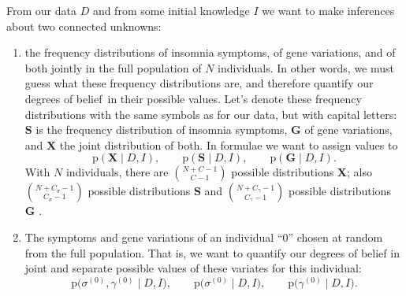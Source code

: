 \documentclass[\ifafour a4paper,12pt,\else a5paper,10pt,\fi%
onecolumn,oneside,article,%
british%
]{memoir}
\theoremstyle{remark}
\theoremstyle{innote}
\newcommand*{\citep}{\parencites}
\newcommand*{\pf}{\mathrm{p}}%
\renewcommand*{\|}{\mathpunct{|}}
\newcommand*{\sect}{\S}%
\newcommand*{\dobs}{degrees of belief}
\newcommand*{\yD}{D}
\newcommand*{\yI}{I}
\newcommand*{\ys}{\sigma}
\newcommand*{\yg}{\gamma}
\newcommand*{\ysi}[1]{\ys^{(#1)}}
\newcommand*{\ygi}[1]{\yg^{(#1)}}
\newcommand*{\yso}{\ysi{0}}
\newcommand*{\ygo}{\ygi{0}}
\newcommand*{\yFs}{\bm{S}}
\newcommand*{\yFg}{\bm{G}}
\newcommand*{\yF}{\bm{X}}
\newcommand*{\yCs}{C_{\sigma}}
\newcommand*{\yCg}{C_{\gamma}}
\begin{document}
\medskip

From our data $\yD$ and from some initial knowledge $\yI$ we want to make
inferences about two connected unknowns:
\begin{enumerate}[label=(\alph*)]
\item the frequency distributions of insomnia symptoms, of gene variations,
  and of both jointly in the full population of $N$ individuals. In other
  words, we must guess what these frequency distributions are, and
  therefore quantify our \dobs\ in their
  possible values. Let's denote these frequency distributions with the same
  symbols as for our data, but with capital letters: $\yFs$ is the
  frequency distribution of insomnia symptoms, $\yFg$ of gene variations,
  and $\yF$ the joint distribution of both. In formulae we want to assign
  values to
  \begin{equation}
    \label{eq:pre_goal_plausibilities}
    \pf(\yF \| \yD,\yI),\qquad
    \pf(\yFs \| \yD,\yI),\qquad
    \pf(\yFg \| \yD,\yI).
  \end{equation}
  With $N$ individuals, there are $\binom{N+C-1}{C-1}$ possible
  distributions $\yF$; also $\binom{N+\yCs-1}{\yCs-1}$ possible
  distributions $\yFs$  and $\binom{N+\yCg-1}{\yCg-1}$ possible
  distributions $\yFg$ \citep[\sect~2.1]{csiszaretal2004b}.
\item The symptoms and gene variations of an individual \enquote{$0$}
  chosen at random from the full population. That is, we want to quantify
  our degrees of belief in joint and separate possible values of these
  variates for this individual:
  \begin{equation}
    \label{eq:pre_goal_ind_plausibilities}
    \pf\bigl( \ysi{0}, \ygi{0} \| \yD, \yI \bigr),\qquad
    \pf\bigl( \ysi{0} \| \yD, \yI \bigr),\qquad
    \pf\bigl(  \ygi{0} \| \yD, \yI \bigr).
  \end{equation}
\end{enumerate}



\end{document}
